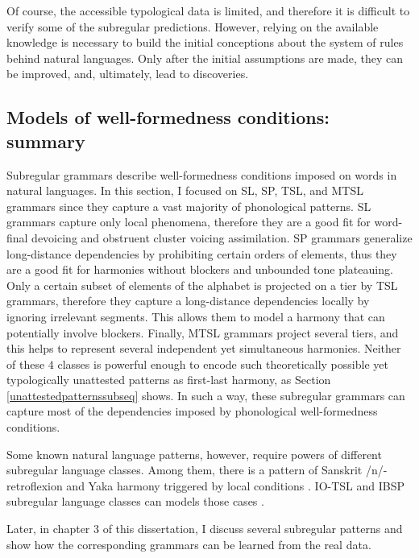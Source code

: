 Of course, the accessible typological data is limited, and therefore it is difficult to verify some of the subregular predictions.
However, relying on the available knowledge is necessary to build the initial conceptions about the system of rules behind natural languages.
Only after the initial assumptions are made, they can be improved, and, ultimately, lead to discoveries.



\subsection{Models of well-formedness conditions: summary}

Subregular grammars describe well-formedness conditions imposed on words in natural languages.
In this section, I focused on SL, SP, TSL, and MTSL grammars since they capture a vast majority of phonological patterns.
SL grammars capture only local phenomena, therefore they are a good fit for word-final devoicing and obstruent cluster voicing assimilation.
SP grammars generalize long-distance dependencies by prohibiting certain orders of elements, thus they are a good fit for harmonies without blockers and unbounded tone plateauing.
Only a certain subset of elements of the alphabet is projected on a tier by TSL grammars, therefore they capture a long-distance dependencies locally by ignoring irrelevant segments.
This allows them to model a harmony that can potentially involve blockers.
Finally, MTSL grammars project several tiers, and this helps to represent several independent yet simultaneous harmonies. 
Neither of these $4$ classes is powerful enough to encode such theoretically possible yet typologically unattested patterns as first-last harmony, as Section \ref{unattestedpatternssubseq} shows. 
In such a way, these subregular grammars can capture most of the dependencies imposed by phonological well-formedness conditions.

Some known natural language patterns, however, require powers of different subregular language classes.
Among them, there is a pattern of Sanskrit /n/-retroflexion and Yaka harmony triggered by local conditions \citep{Walker2000,McMullin2016,Karakas2020}.
IO-TSL and IBSP subregular language classes can models those cases \citep{Graf17Phonology,Graf18NELS}.


Later, in chapter 3 of this dissertation, I discuss several subregular patterns and show how the corresponding grammars can be learned from the real data.










